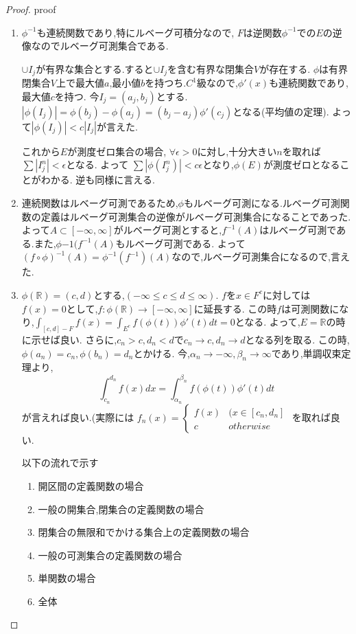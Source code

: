 \begin{proof}
proof 
\begin{enumerate}
    \item 
$\phi^{-1}$も連続関数であり,特にルベーグ可積分なので, $F$は逆関数$\phi^{-1}$での$E$の逆像なのでルベーグ可測集合である.

$\cup I_j$が有界な集合とする.すると$\cup I_j$を含む有界な閉集合$V$が存在する.
$\phi$は有界閉集合$V$上で最大値$a$,最小値$b$を持つち.$C^1$級なので,$\phi'(x)$も連続関数であり,最大値$c$を持つ.
今$I_j = (a_j,b_j)$とする.
$|\phi(I_j)| = \phi(b_j) - \phi(a_j) = (b_j - a_j) \phi'(c_j)$となる(平均値の定理).
よって$|\phi(I_j)| < c |I_j|$が言えた.

これから$E$が測度ゼロ集合の場合,
$\forall \epsilon > 0$に対し,十分大きい$n$を取れば$\sum |I_j^n | < \epsilon$となる.
よって
$\sum |\phi(I_j^n)| < c \epsilon$となり,$\phi(E)$が測度ゼロとなることがわかる.
逆も同様に言える.
\item 連続関数はルベーグ可測であるため,$\phi$もルベーグ可測になる.ルベーグ可測関数の定義はルベーグ可測集合の逆像がルベーグ可測集合になることであった.
よって$A \subset [- \infty, \infty]$がルベーグ可測とすると,$f^{-1}(A)$はルベーグ可測である.また,$\phi{-1}(f^{-1}(A)$もルベーグ可測である.
よって$(f \circ \phi)^{-1}(A) = \phi^{-1}(f^{-1})(A)$なので,ルベーグ可測集合になるので,言えた.
\item 
$\phi(\mathbb{R}) = (c, d)$とする,$(- \infty \le c \le d \le \infty)$.
$f$を$x \in F^c$に対しては$f(x) = 0$として,$f: \phi(\mathbb{R}) \to [- \infty, \infty]$に延長する.
この時$f$は可測関数になり,$\int_{[c,d] - F} f(x)  = \int_{E^c} f(\phi(t))\phi'(t)dt = 0$となる.
よって,$E = \mathbb{R}$の時に示せば良い.
さらに,$c_n > c, d_n < d$で$c_n \to c, d_n \to d$となる列を取る.
この時,$\phi(a_n) = c_n ,\phi(b_n) = d_n$とかける.
今,$\alpha_n \to - \infty, \beta_n \to \infty$であり,単調収束定理より,
\begin{equation*}
    \int_{c_n}^{d_n} f(x) dx = \int_{\alpha_n}^{\beta_n}  f(\phi(t))\phi'(t)dt
\end{equation*}
が言えれば良い.(実際には
$f_n(x) = \begin{cases} 
 f(x)  &   (x \in [c_n, d_n]\\
 c    & otherwise
\end{cases}$
を取れば良い.


以下の流れで示す
\begin{enumerate}
\item 開区間の定義関数の場合
\item 一般の開集合,閉集合の定義関数の場合
\item 閉集合の無限和でかける集合上の定義関数の場合
\item 一般の可測集合の定義関数の場合
\item 単関数の場合
\item 全体
\end{enumerate}


\end{enumerate}
\end{proof}
